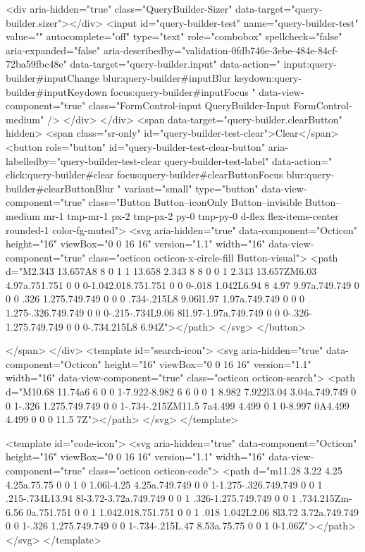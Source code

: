             <div aria-hidden="true" class="QueryBuilder-Sizer" data-target="query-builder.sizer"></div>
            <input id="query-builder-test" name="query-builder-test" value="" autocomplete="off" type="text" role="combobox" spellcheck="false" aria-expanded="false" aria-describedby="validation-0fdb746e-3ebe-484e-84cf-72ba59fbc48e" data-target="query-builder.input" data-action="
          input:query-builder#inputChange
          blur:query-builder#inputBlur
          keydown:query-builder#inputKeydown
          focus:query-builder#inputFocus
        " data-view-component="true" class="FormControl-input QueryBuilder-Input FormControl-medium" />
          </div>
        </div>
          <span data-target="query-builder.clearButton" hidden>
            <span class="sr-only" id="query-builder-test-clear">Clear</span>
            <button role="button" id="query-builder-test-clear-button" aria-labelledby="query-builder-test-clear query-builder-test-label" data-action="
                  click:query-builder#clear
                  focus:query-builder#clearButtonFocus
                  blur:query-builder#clearButtonBlur
                " variant="small" type="button" data-view-component="true" class="Button Button--iconOnly Button--invisible Button--medium mr-1 tmp-mr-1 px-2 tmp-px-2 py-0 tmp-py-0 d-flex flex-items-center rounded-1 color-fg-muted">  <svg aria-hidden="true" data-component="Octicon" height="16" viewBox="0 0 16 16" version="1.1" width="16" data-view-component="true" class="octicon octicon-x-circle-fill Button-visual">
    <path d="M2.343 13.657A8 8 0 1 1 13.658 2.343 8 8 0 0 1 2.343 13.657ZM6.03 4.97a.751.751 0 0 0-1.042.018.751.751 0 0 0-.018 1.042L6.94 8 4.97 9.97a.749.749 0 0 0 .326 1.275.749.749 0 0 0 .734-.215L8 9.06l1.97 1.97a.749.749 0 0 0 1.275-.326.749.749 0 0 0-.215-.734L9.06 8l1.97-1.97a.749.749 0 0 0-.326-1.275.749.749 0 0 0-.734.215L8 6.94Z"></path>
</svg>
</button>

          </span>
      </div>
      <template id="search-icon">
  <svg aria-hidden="true" data-component="Octicon" height="16" viewBox="0 0 16 16" version="1.1" width="16" data-view-component="true" class="octicon octicon-search">
    <path d="M10.68 11.74a6 6 0 0 1-7.922-8.982 6 6 0 0 1 8.982 7.922l3.04 3.04a.749.749 0 0 1-.326 1.275.749.749 0 0 1-.734-.215ZM11.5 7a4.499 4.499 0 1 0-8.997 0A4.499 4.499 0 0 0 11.5 7Z"></path>
</svg>
</template>

<template id="code-icon">
  <svg aria-hidden="true" data-component="Octicon" height="16" viewBox="0 0 16 16" version="1.1" width="16" data-view-component="true" class="octicon octicon-code">
    <path d="m11.28 3.22 4.25 4.25a.75.75 0 0 1 0 1.06l-4.25 4.25a.749.749 0 0 1-1.275-.326.749.749 0 0 1 .215-.734L13.94 8l-3.72-3.72a.749.749 0 0 1 .326-1.275.749.749 0 0 1 .734.215Zm-6.56 0a.751.751 0 0 1 1.042.018.751.751 0 0 1 .018 1.042L2.06 8l3.72 3.72a.749.749 0 0 1-.326 1.275.749.749 0 0 1-.734-.215L.47 8.53a.75.75 0 0 1 0-1.06Z"></path>
</svg>
</template>

